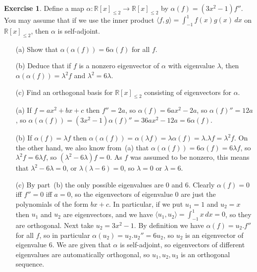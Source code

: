 \documentclass{amsart}
\newcommand{\R}         {{\mathbb{R}}}
\newcommand{\al}        {\alpha}
\newcommand{\lm}        {\lambda}
\newcommand{\ip}[1]     {\langle #1\rangle}
\renewcommand{\:}       {\colon}
\theoremstyle{definition}
\newtheorem{exercise}{Exercise}[section]
\renewenvironment{solution}{\SolutionAtEnd}{\endSolutionAtEnd}
\begin{document}
\begin{exercise}\label{ex-sixpotent}
 Define a map $\al\:\R[x]_{\leq 2}\to\R[x]_{\leq 2}$ by
 $\al(f)=(3x^2-1)f''$.  You may assume that if we use the inner
 product $\ip{f,g}=\int_{-1}^1 f(x)g(x)\,dx$ on $\R[x]_{\leq 2}$, then
 $\al$ is self-adjoint.
 \begin{itemize}
  \item[(a)] Show that $\al(\al(f))=6\al(f)$ for all $f$.
  \item[(b)] Deduce that if $f$ is a nonzero eigenvector of $\al$ with
   eigenvalue $\lm$, then $\al(\al(f))=\lm^2f$ and $\lm^2=6\lm$.
  \item[(c)] Find an orthogonal basis for $\R[x]_{\leq 2}$ consisting
   of eigenvectors for $\al$.
 \end{itemize}
\end{exercise}
\begin{solution}
 \begin{itemize}
  \item[(a)] If $f=ax^2+bx+c$ then $f''=2a$, so $\al(f)=6ax^2-2a$, so
   $\al(f)''=12a$, so
   $\al(\al(f))=(3x^2-1)\al(f)''=36ax^2-12a=6\al(f)$.
  \item[(b)] If $\al(f)=\lm f$ then
   $\al(\al(f))=\al(\lm f)=\lm\al(f)=\lm.\lm f=\lm^2 f$.  On the other
   hand, we also know from~(a) that $\al(\al(f))=6\al(f)=6\lm f$, so
   $\lm^2 f=6\lm f$, so $(\lm^2-6\lm)f=0$.  As $f$ was assumed to be
   nonzero, this means that $\lm^2-6\lm=0$, or $\lm(\lm-6)=0$, so
   $\lm=0$ or $\lm=6$.
  \item[(c)] By part~(b) the only possible eigenvalues are $0$ and
   $6$.  Clearly $\al(f)=0$ iff $f''=0$ iff $a=0$, so the eigenvectors
   of eigenvalue $0$ are just the polynomials of the form $bx+c$.
   In particular, if we put $u_1=1$ and $u_2=x$ then $u_1$ and $u_2$
   are eigenvectors, and we have $\ip{u_1,u_2}=\int_{-1}^1 x\,dx=0$,
   so they are orthogonal.  Next take $u_2=3x^2-1$.  By definition
   we have $\al(f)=u_2.f''$ for all $f$, so in particular
   $\al(u_2)=u_2.u_2''=6u_2$, so $u_2$ is an eigenvector of eigenvalue
   $6$.  We are given that $\al$ is self-adjoint, so eigenvectors of
   different eigenvalues are automatically orthogonal, so
   $u_1,u_2,u_3$ is an orthogonal sequence.  
 \end{itemize}
\end{solution}
\end{document}
